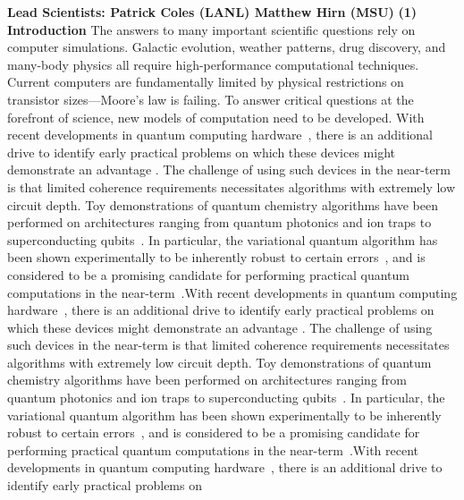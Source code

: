 \documentclass[10pt]{article}
\begin{document}
{\bf Lead Scientists: Patrick Coles (LANL) Matthew Hirn (MSU)}
\textbf{(1) Introduction} \tab The answers to many important scientific questions rely on computer simulations. Galactic evolution, weather patterns, drug discovery, and many-body physics all require high-performance computational techniques. Current computers are fundamentally limited by physical restrictions on transistor sizes---Moore's law is failing. To answer critical questions at the forefront of science, new models of computation need to be developed.
With recent developments in quantum computing
hardware~\cite{Corcoles2015,Riste2015,Kelly2015,Barends2016,Roushan2017},
there is an additional drive to identify early practical problems on
which these devices might demonstrate an advantage
\cite{Mohseni2017,Boixo2016}. The challenge of using such devices in
the near-term is that limited coherence requirements necessitates
algorithms with extremely low circuit depth. Toy demonstrations of
quantum chemistry algorithms have been performed on architectures
ranging from quantum photonics and ion traps to superconducting
qubits~\cite{Lanyon2010,Li2011,Wang2014,Peruzzo2013,Shen2015,OMalley2016,Kandala2017}. In
particular, the variational quantum algorithm
\cite{Peruzzo2013,McClean2015} has been shown experimentally to be
inherently robust to certain errors~\cite{OMalley2016}, and is
considered to be a promising candidate for performing practical
quantum computations in the near-term~\cite{Wecker2015a,Mueck2015}.With recent developments in quantum computing
hardware~\cite{Corcoles2015,Riste2015,Kelly2015,Barends2016,Roushan2017},
there is an additional drive to identify early practical problems on
which these devices might demonstrate an advantage
\cite{Mohseni2017,Boixo2016}. The challenge of using such devices in
the near-term is that limited coherence requirements necessitates
algorithms with extremely low circuit depth. Toy demonstrations of
quantum chemistry algorithms have been performed on architectures
ranging from quantum photonics and ion traps to superconducting
qubits~\cite{Lanyon2010,Li2011,Wang2014,Peruzzo2013,Shen2015,OMalley2016,Kandala2017}. In
particular, the variational quantum algorithm
\cite{Peruzzo2013,McClean2015} has been shown experimentally to be
inherently robust to certain errors~\cite{OMalley2016}, and is
considered to be a promising candidate for performing practical
quantum computations in the near-term~\cite{Wecker2015a,Mueck2015}.With recent developments in quantum computing
hardware~\cite{Corcoles2015,Riste2015,Kelly2015,Barends2016,Roushan2017},
there is an additional drive to identify early practical problems on
\end{document}
